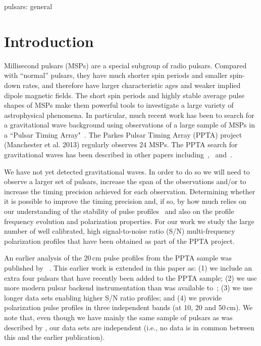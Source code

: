 \documentclass[useAMS,usenatbib]{mn2e}
\begin{document}
\begin{keywords}
%
pulsars: general
%
\end{keywords}


\section{Introduction}

Millisecond pulsars (MSPs) are a special subgroup of radio pulsars. 
%
Compared with ``normal'' pulsars, they have much shorter spin periods 
and smaller spin-down rates, and therefore have larger characteristic 
ages and weaker implied dipole magnetic fields.
%
The short spin periods and highly stable average pulse shapes of MSPs 
make them powerful tools to investigate a large variety of astrophysical phenomena.
In particular, much recent work has been to search for a gravitational wave background using 
observations of a large sample of MSPs in a ``Pulsar Timing Array"~\citep[e.g.,][]{Foster90}.
%
The Parkes Pulsar Timing Array (PPTA) project (Manchester et al. 2013) 
regularly observes $24$ MSPs. 
%
The PPTA search for gravitational waves has been described in other papers 
including~\citet{Shannon13b},~\citet{Wang14} and~\citet{Zhu14}. 
%

We have not yet detected gravitational waves. In order to do so we will need 
to observe a larger set of pulsars, increase the span of the observations and/or 
to increase the timing precision achieved for each observation. 
%
%
%
Determining whether it is possible to improve the timing precision and, if so, 
by how much relies on our understanding of the stability of pulse profiles~\citep[e.g.,][]{Shannon14} 
and also on the profile frequency evolution and polarization properties.
%
For our work we study the large number of well calibrated, high signal-to-noise 
ratio (S/N) multi-frequency polarization profiles that have been obtained as 
part of the PPTA project. 
%

An earlier analysis of the 20\,cm pulse profiles from the PPTA sample was published by
~\citet{Yan11}. This earlier work is extended in this paper as:
%
(1) we include an extra four pulsars that have recently been added to the PPTA sample;
(2) we use more modern pulsar backend instrumentation than was available to~\citet{Yan11};
(3) we use longer data sets enabling higher S/N ratio profiles; and
(4) we provide polarization pulse profiles in three independent bands 
(at 10, 20 and 50\,cm).
%
We note that, even though we have mainly the same sample of pulsars as was described by \citet{Yan11}, 
our data sets are independent (i.e., no data is in common between this and the earlier 
publication).
\end{document}

